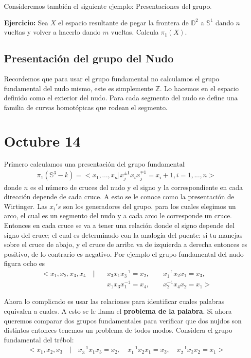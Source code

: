 \documentclass{article}
\theoremstyle{mytheoremstyle}
\theoremstyle{mytheoremstyle}
\theoremstyle{myproblemstyle}
\begin{document}
    Consideremos también el siguiente ejemplo: Presentaciones del grupo.

    \textbf{Ejercicio: } Sea $X$ el espacio resultante de pegar la frontera de $\mathbb{D}^2$ a $\mathbb{S}^1$ dando $n$ vueltas y volver a hacerlo dando $m$ vueltas. Calcula $\pi_1(X)$. 

    \subsection{Presentación del grupo del Nudo}
    Recordemos que para usar el grupo fundamental no calculamos el grupo fundamental del nudo mismo, este es simplemente $\mathbb{Z}$. Lo hacemos en el espacio definido como el exterior del nudo. Para cada segmento del nudo se define una familia de curvas homotópicas que rodean el segmento.

    \section{Octubre 14}

    Primero calculamos una presentación del grupo fundamental 
    \begin{align}
      \pi_1(\mathbb{S}^3- k )=<x_1,...,x_n | x^{\pm 1}_{j}x_i x_j^{\mp1} = x_i+1, i = 1,...,n>
    \end{align}
    donde $n$ es el número de cruces del nudo y el signo y la correspondiente en cada dirección depende de cada cruce. A esto se le conoce como la presentación de Wirtinger. Las $x_i's$ son los generadores del grupo, para los cuales elegimos un arco, el cual es un segmento del nudo y a cada arco le corresponde un cruce. Entonces en cada cruce se va a tener una relación donde el signo depende del signo del cruce; el cual es determinado con la analogía del puente: si tu manejas sobre el cruce de abajo, y el cruce de arriba va de izquierda a derecha entonces es positivo, de lo contrario es negativo. Por ejemplo el grupo fundamental del nudo figura ocho es 
    \begin{align}
      <x_1,x_2,x_3,x_4 \quad |\quad  & x_3x_1x_3^{-1} =x_2 ,\qquad  x_1^{-1} x_2x_1 = x_3 , \\ & x_1x_3x_1^{-1}=x_4,\qquad  x_2^{-1}x_4x_2=x_1 >
    \end{align}

    Ahora lo complicado es usar las relaciones para identificar cuales palabras equivalen a cuales. A esto se le llama el \textbf{problema de la palabra}. Si ahora queremos comparar dos grupos fundamentales para verificar que dos nujdos son distintos entonces tenemos un problema de todos modos. Considera el  grupo fundamental del trébol:
    \begin{align}
      <x_1,x_2,x_3 \quad | \quad x_3^{-1}x_1x_3=x_2 ,\quad x_1^{-1}x_2 x_1 = x_3 , \quad x_2^{-1} x_3 x_2 = x_1 > 
    \end{align}
\end{document}

